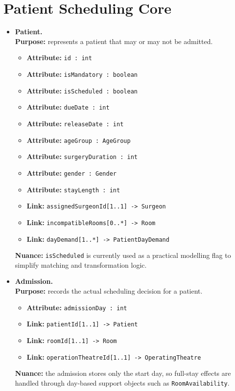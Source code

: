 \documentclass[10pt]{article}
\newcommand{\clabel}[1]{{\large\bfseries #1}}
\begin{document}
\section*{Patient Scheduling Core}
\begin{itemize}
    \item \clabel{Patient.}\\
    \textbf{Purpose:} represents a patient that may or may not be admitted.
    \begin{itemize}
        \item \textbf{Attribute:} \texttt{id : int}
        \item \textbf{Attribute:} \texttt{isMandatory : boolean}
        \item \textbf{Attribute:} \texttt{isScheduled : boolean}
        \item \textbf{Attribute:} \texttt{dueDate : int}
        \item \textbf{Attribute:} \texttt{releaseDate : int}
        \item \textbf{Attribute:} \texttt{ageGroup : AgeGroup}
        \item \textbf{Attribute:} \texttt{surgeryDuration : int}
        \item \textbf{Attribute:} \texttt{gender : Gender}
        \item \textbf{Attribute:} \texttt{stayLength : int}
        \item \textbf{Link:} \texttt{assignedSurgeonId[1..1] -> Surgeon}
        \item \textbf{Link:} \texttt{incompatibleRooms[0..*] -> Room}
        \item \textbf{Link:} \texttt{dayDemand[1..*] -> PatientDayDemand}
    \end{itemize}
    \textbf{Nuance:} \texttt{isScheduled} is currently used as a practical modelling flag to simplify matching and transformation logic.

    \item \clabel{Admission.}\\
    \textbf{Purpose:} records the actual scheduling decision for a patient.
    \begin{itemize}
        \item \textbf{Attribute:} \texttt{admissionDay : int}
        \item \textbf{Link:} \texttt{patientId[1..1] -> Patient}
        \item \textbf{Link:} \texttt{roomId[1..1] -> Room}
        \item \textbf{Link:} \texttt{operationTheatreId[1..1] -> OperatingTheatre}
    \end{itemize}
    \textbf{Nuance:} the admission stores only the start day, so full-stay effects are handled through day-based support objects such as \texttt{RoomAvailability}.


\end{itemize}
\end{document}
